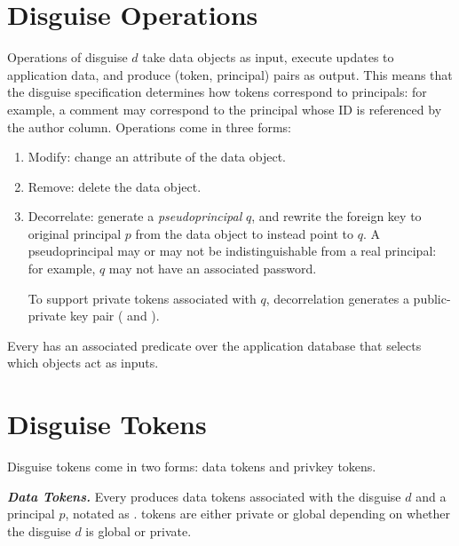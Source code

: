 \section{Disguise Operations} 
Operations  of disguise $d$ take data objects as input, execute updates to application
data, and produce (token, principal) pairs
as output. This means that the disguise specification determines how tokens correspond to
principals: for example, a comment may correspond to the principal whose ID is referenced by the
author column.
Operations come in three forms:
\begin{enumerate}
    \item Modify: change an attribute of the data object.
    \item Remove: delete the data object.
    \item Decorrelate: generate a \emph{pseudoprincipal} $q$, and rewrite the foreign key to original
        principal $p$ from the data object to instead point to $q$.
        A pseudoprincipal may or may not be indistinguishable from a real principal: for example,
        $q$ may not have an associated password.

        To support private tokens associated with $q$, decorrelation generates a
        public-private key pair ( and ).
\end{enumerate}
Every  has an associated predicate over the application database that selects which objects
act as  inputs.

\section{Disguise Tokens} 
Disguise tokens come in two forms: data tokens and privkey tokens.

\vspace{6pt}
\noindent\textbf{\emph{Data Tokens.}}
Every  produces data tokens associated with the disguise $d$ and a
principal $p$, notated as .  tokens are either private or global depending on
whether the disguise $d$ is global or private. 

